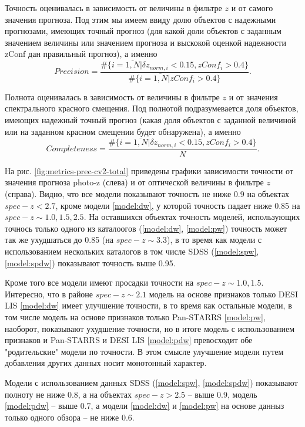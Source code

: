 \documentclass[fleqn,usenatbib]{mnras}
\begin{document}
Точность оценивалась в зависимость от величины в фильтре $z$ и от самого значения прогноза. Под этим мы имеем ввиду долю объектов с надежными прогнозами, имеющих точный прогноз (для какой доли объектов с заданным значением величины или значением прогноза и выскокой оценкой надежности zConf дан правильный прогноз), а именно \begin{equation}\label{eq:precision}
    Precision = \frac{\#\{i = \overline{1, N} | \delta z_{norm, i} < 0.15, zConf_i > 0.4\}}{\#\{i = \overline{1, N} | zConf_i > 0.4\}}.
\end{equation}

Полнота оценивалась в зависимость от величины в фильтре $z$ и от значения спектрального красного смещения. Под полнотой подразумевается доля объектов, имеющих надежный точный прогноз (какая доля объектов с заданной величиной или на заданном красном смещении будет обнаружена), а именно \begin{equation}\label{eq:completeness}
    Completeness = \frac{\#\{i = \overline{1, N} | \delta z_{norm, i} < 0.15, zConf_i > 0.4\}}{N}.
\end{equation}

На рис. \ref{fig:metrics-prec-cv2-total} приведены графики зависимости точности от значения прогноза photo-z (слева) и от оптической величины в фильтре $z$ (справа). Видно, что все модели показывают точность не ниже 0.9 на объектах $spec-z < 2.7$, кроме модели \ref{model:dw}, у которой точность падает ниже 0.85 на $spec-z \sim 1.0, 1.5, 2.5$. На оставшихся объектах точность моделей, использующих точнось только одного из каталоогов (\ref{model:dw}, \ref{model:pw}) точность может так же ухудшаться до 0.85 (на $spec-z \sim 3.3$), в то время как модели с использованием нескольких каталогов в том числе SDSS (\ref{model:spw}, \ref{model:spdw}) показывают точность выше 0.95.

Кроме того все модели имеют просадки точности на $spec-z \sim 1.0, 1.5$. Интересно, что в районе $spec-z \sim 2.1$ модель на основе признаков только DESI LIS \ref{model:dw} имеет улучшение точности, в то время как остальные модели, в том числе модель на основе признаков только Pan-STARRS \ref{model:pw}, наоборот, показывают ухудшение точности, но в итоге модель с использованием признаков и Pan-STARRS и DESI LIS \ref{model:pdw} превосходит обе "родительские" модели по точности. В этом смысле улучшение модели путем добавления других данных носит монотонный характер.

Модели с использованием данных SDSS (\ref{model:spw}, \ref{model:spdw}) показывают полноту не ниже 0.8, а на объектах $spec-z > 2.5$ -- выше 0.9, модель \ref{model:pdw} -- выше 0.7, а модели \ref{model:dw} и \ref{model:pw} на основе данныз только одного обзора -- не ниже 0.6.
\end{document}
